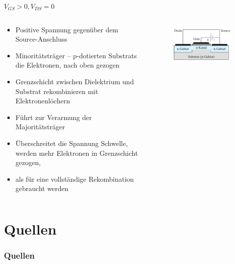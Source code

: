 \documentclass[12pt%
,aspectratio=169%
]{beamer}
\begin{document}
\begin{frame}{$V_{GS} > 0, V_{DS} = 0$}
\begin{columns}[T] %
\begin{column}{.62\textwidth}
	\begin{itemize}
		\item Positive Spannung gegenüber dem Source-Anschluss
		\item Minoritätsträger -- p-dotierten Substrats die Elektronen, nach oben gezogen
		\item Grenzschicht zwischen Dielektrium und Substrat rekombinieren mit Elektronenlöchern
		\item Führt zur Verarmung der Majoritätsträger
		\item Überschreitet die Spannung Schwelle, werden mehr Elektronen in Grenzschicht gezogen,
		\item als für eine vollständige Rekombination gebraucht werden
	\end{itemize}
\end{column}%
\hfill%
\begin{column}{.38\textwidth}
\begin{figure}
\center
\includegraphics[scale=0.5]{pictures/fall2}\\
\end{figure}
\end{column}%
\end{columns}
\end{frame}

\section*{Quellen}
\appendix
\begin{frame}[allowframebreaks]
  \frametitle<presentation>{Quellen}
\printbibliography
\end{frame}
\end{document}
